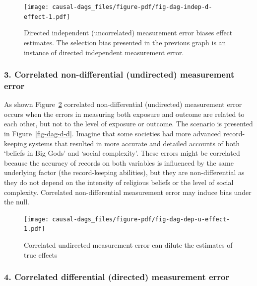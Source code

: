 \documentclass[
  singlecolumn]{report}
\begin{document}
\begin{figure}

{\centering \texttt{[image: causal-dags\_files/figure-pdf/fig-dag-indep-d-effect-1.pdf]}

}

\caption{\label{fig-dag-indep-d-effect}Directed independent
(uncorrelated) measurement error biases effect estimates. The selection
bias presented in the previous graph is an instance of directed
independent measurement error.}

\end{figure}

\hypertarget{correlated-non-differential-undirected-measurement-error}{%
\subsubsection{\texorpdfstring{3. \textbf{Correlated non-differential
(undirected) measurement
error}}{3. Correlated non-differential (undirected) measurement error}}\label{correlated-non-differential-undirected-measurement-error}}

As shown Figure~\ref{fig-dag-dep-u-effect} correlated non-differential
(undirected) measurement error occurs when the errors in measuring both
exposure and outcome are related to each other, but not to the level of
exposure or outcome. The scenario is presented in
Figure~\ref{fig-dag-d-d}. Imagine that some societies had more advanced
record-keeping systems that resulted in more accurate and detailed
accounts of both `beliefs in Big Gods' and `social complexity'. These
errors might be correlated because the accuracy of records on both
variables is influenced by the same underlying factor (the
record-keeping abilities), but they are non-differential as they do not
depend on the intensity of religious beliefs or the level of social
complexity. Correlated non-differential measurement error may induce
bias under the null.

\begin{figure}

{\centering \texttt{[image: causal-dags\_files/figure-pdf/fig-dag-dep-u-effect-1.pdf]}

}

\caption{\label{fig-dag-dep-u-effect}Correlated undirected measurement
error can dilute the estimates of true effects}

\end{figure}

\hypertarget{correlated-differential-directed-measurement-error}{%
\subsubsection{\texorpdfstring{4. \textbf{Correlated differential
(directed) measurement
error}}{4. Correlated differential (directed) measurement error}}\label{correlated-differential-directed-measurement-error}}
\end{document}
